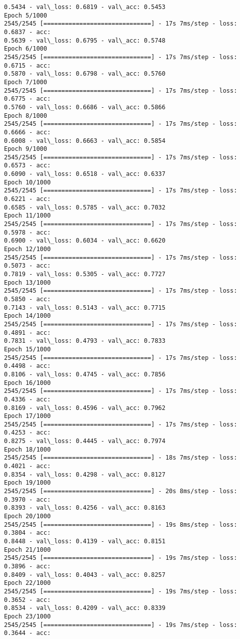 \documentclass[11pt]{article}
\begin{document}
\begin{Verbatim}[commandchars=\\\{\}]
0.5434 - val\_loss: 0.6819 - val\_acc: 0.5453
Epoch 5/1000
2545/2545 [==============================] - 17s 7ms/step - loss: 0.6837 - acc:
0.5639 - val\_loss: 0.6795 - val\_acc: 0.5748
Epoch 6/1000
2545/2545 [==============================] - 17s 7ms/step - loss: 0.6715 - acc:
0.5870 - val\_loss: 0.6798 - val\_acc: 0.5760
Epoch 7/1000
2545/2545 [==============================] - 17s 7ms/step - loss: 0.6775 - acc:
0.5760 - val\_loss: 0.6686 - val\_acc: 0.5866
Epoch 8/1000
2545/2545 [==============================] - 17s 7ms/step - loss: 0.6666 - acc:
0.6008 - val\_loss: 0.6663 - val\_acc: 0.5854
Epoch 9/1000
2545/2545 [==============================] - 17s 7ms/step - loss: 0.6573 - acc:
0.6090 - val\_loss: 0.6518 - val\_acc: 0.6337
Epoch 10/1000
2545/2545 [==============================] - 17s 7ms/step - loss: 0.6221 - acc:
0.6585 - val\_loss: 0.5785 - val\_acc: 0.7032
Epoch 11/1000
2545/2545 [==============================] - 17s 7ms/step - loss: 0.5978 - acc:
0.6900 - val\_loss: 0.6034 - val\_acc: 0.6620
Epoch 12/1000
2545/2545 [==============================] - 17s 7ms/step - loss: 0.5073 - acc:
0.7819 - val\_loss: 0.5305 - val\_acc: 0.7727
Epoch 13/1000
2545/2545 [==============================] - 17s 7ms/step - loss: 0.5850 - acc:
0.7143 - val\_loss: 0.5143 - val\_acc: 0.7715
Epoch 14/1000
2545/2545 [==============================] - 17s 7ms/step - loss: 0.4891 - acc:
0.7831 - val\_loss: 0.4793 - val\_acc: 0.7833
Epoch 15/1000
2545/2545 [==============================] - 17s 7ms/step - loss: 0.4498 - acc:
0.8106 - val\_loss: 0.4745 - val\_acc: 0.7856
Epoch 16/1000
2545/2545 [==============================] - 17s 7ms/step - loss: 0.4336 - acc:
0.8169 - val\_loss: 0.4596 - val\_acc: 0.7962
Epoch 17/1000
2545/2545 [==============================] - 17s 7ms/step - loss: 0.4253 - acc:
0.8275 - val\_loss: 0.4445 - val\_acc: 0.7974
Epoch 18/1000
2545/2545 [==============================] - 18s 7ms/step - loss: 0.4021 - acc:
0.8354 - val\_loss: 0.4298 - val\_acc: 0.8127
Epoch 19/1000
2545/2545 [==============================] - 20s 8ms/step - loss: 0.3970 - acc:
0.8393 - val\_loss: 0.4256 - val\_acc: 0.8163
Epoch 20/1000
2545/2545 [==============================] - 19s 8ms/step - loss: 0.3804 - acc:
0.8448 - val\_loss: 0.4139 - val\_acc: 0.8151
Epoch 21/1000
2545/2545 [==============================] - 19s 7ms/step - loss: 0.3896 - acc:
0.8409 - val\_loss: 0.4043 - val\_acc: 0.8257
Epoch 22/1000
2545/2545 [==============================] - 19s 7ms/step - loss: 0.3652 - acc:
0.8534 - val\_loss: 0.4209 - val\_acc: 0.8339
Epoch 23/1000
2545/2545 [==============================] - 19s 7ms/step - loss: 0.3644 - acc:

\end{Verbatim}
\end{document}
